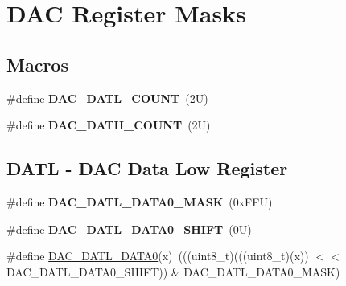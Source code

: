\hypertarget{group___d_a_c___register___masks}{}\section{D\+AC Register Masks}
\label{group___d_a_c___register___masks}
\subsection*{Macros}
\begin{DoxyCompactItemize}
\item 
\mbox{\label{group___d_a_c___register___masks_gaa16ae55ea8545fdeea11d28e84768d98}} 
\#define {\bfseries D\+A\+C\+\_\+\+D\+A\+T\+L\+\_\+\+C\+O\+U\+NT}~(2\+U)
\item 
\mbox{\label{group___d_a_c___register___masks_gafce897f56e48f350a733e28b92be7e4c}} 
\#define {\bfseries D\+A\+C\+\_\+\+D\+A\+T\+H\+\_\+\+C\+O\+U\+NT}~(2\+U)
\end{DoxyCompactItemize}
\subsection*{D\+A\+TL -\/ D\+AC Data Low Register}
\begin{DoxyCompactItemize}
\item 
\mbox{\label{group___d_a_c___register___masks_ga06d752efe9ec5bab7d61ccf9c2689345}} 
\#define {\bfseries D\+A\+C\+\_\+\+D\+A\+T\+L\+\_\+\+D\+A\+T\+A0\+\_\+\+M\+A\+SK}~(0x\+F\+F\+U)
\item 
\mbox{\label{group___d_a_c___register___masks_gad9030129a0f34502c115abd36728d001}} 
\#define {\bfseries D\+A\+C\+\_\+\+D\+A\+T\+L\+\_\+\+D\+A\+T\+A0\+\_\+\+S\+H\+I\+FT}~(0\+U)
\item 
\#define \mbox{\hyperlink{group___d_a_c___register___masks_ga87995bd867b0ea7e137b5a5a8cbfdf1e}{D\+A\+C\+\_\+\+D\+A\+T\+L\+\_\+\+D\+A\+T\+A0}}(x)~(((uint8\+\_\+t)(((uint8\+\_\+t)(x)) $<$$<$ D\+A\+C\+\_\+\+D\+A\+T\+L\+\_\+\+D\+A\+T\+A0\+\_\+\+S\+H\+I\+FT)) \& D\+A\+C\+\_\+\+D\+A\+T\+L\+\_\+\+D\+A\+T\+A0\+\_\+\+M\+A\+SK)
\end{DoxyCompactItemize}
